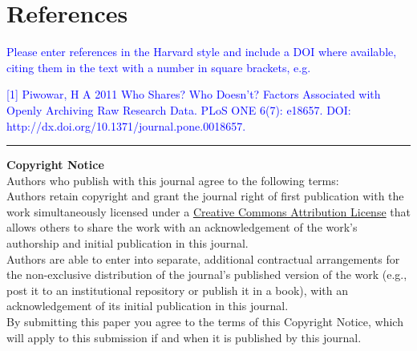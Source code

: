 \documentclass{jors}
\begin{document}
{}


\section*{References}



\textcolor{blue}{Please enter references in the Harvard style and include a DOI where available, citing them in the text with a number in square brackets, e.g. \\ }

\textcolor{blue}{[1] Piwowar, H A 2011 Who Shares? Who Doesn't? Factors Associated with Openly Archiving Raw Research Data. PLoS ONE 6(7): e18657. DOI: \\ http://dx.doi.org/10.1371/journal.pone.0018657.}

\vspace{2cm}

\rule{\textwidth}{1pt}

{ \bf Copyright Notice} \\
Authors who publish with this journal agree to the following terms: \\

Authors retain copyright and grant the journal right of first publication with the work simultaneously licensed under a  \href{http://creativecommons.org/licenses/by/3.0/}{Creative Commons Attribution License} that allows others to share the work with an acknowledgement of the work's authorship and initial publication in this journal. \\

Authors are able to enter into separate, additional contractual arrangements for the non-exclusive distribution of the journal's published version of the work (e.g., post it to an institutional repository or publish it in a book), with an acknowledgement of its initial publication in this journal. \\

By submitting this paper you agree to the terms of this Copyright Notice, which will apply to this submission if and when it is published by this journal.
\end{document}
